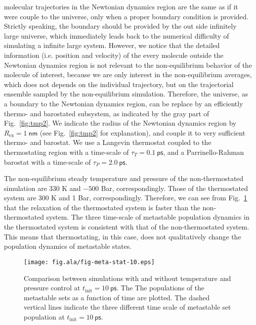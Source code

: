 \documentclass[a4paper,preprint,onecolumn]{revtex4-1}
\begin{document}
molecular trajectories in the Newtonian dynamics region are the same
as if it were couple to the universe, only when a proper boundary
condition is provided. Strictly speaking, the boundary should be
provided by the out side infinitely large universe, which immediately
leads back to the numerical difficulty of simulating a infinite large
system. However, we notice that the detailed information
(i.e. position and velocity) of the every molecule outside the
Newtonian dynamics region is not relevant to the non-equilibrium
behavior of the molecule of interest, because we are only interest in
the non-equilibrium averages, which does not depends on the individual
trajectory, but on the trajectorial ensemble sampled by the
non-equilibrium simulation.  Therefore, the universe, as a boundary to
the Newtonian dynamics region, can be replace by
an efficiently thermo- and barostated subsystem, as indicated by the gray
part of Fig.~\ref{fig:tmp2}. 
We indicate the radius of the Newtonian dynamics region by
$R_{\textrm{ex}} = 1~\textsf{nm}$ (see Fig.~\ref{fig:tmp2} for
explanation), and couple it to very sufficient thermo- and
barostat. We use a Langevin thermostat coupled to the thermostating
region with a time-scale of $\tau_{T} = 0.1~\textsf{ps}$, and a
Parrinello-Rahman barostat with a time-scale of $\tau_{P} =
2.0~\textsf{ps}$.

The non-equilibrium steady temperature and pressure of the
non-thermostated simulation are $330$ K and $-500$ Bar,
correspondingly. Those of the thermostated system are $300$ K and 1
Bar, correspondingly. Therefore, we can see from Fig.~\ref{fig:tmp6}
that the relaxation of the thermostated system is faster than the
non-thermostated system. The three time-scale of metastable population
dynamics in the thermostated system is consistent with that of the
non-thermostated system. This means that thermostating, in this case,
does not qualitatively change the population dynamics of metastable
states.

\begin{figure}
  \centering
  \texttt{[image: fig.ala/fig-meta-stat-10.eps]}
  \caption{ Comparison between simulations with and without
    temperature and pressure control at $t_{\textrm{init}} =
    10~\textsf{ps}$. The The populations of the metastable sets as a
    function of time are plotted.  The dashed vertical lines indicate
    the three different time scale of metastable set population at
    $t_{\textrm{init}} = 10~\textsf{ps}$.}
  \label{fig:tmp6}
\end{figure}
\end{document}
